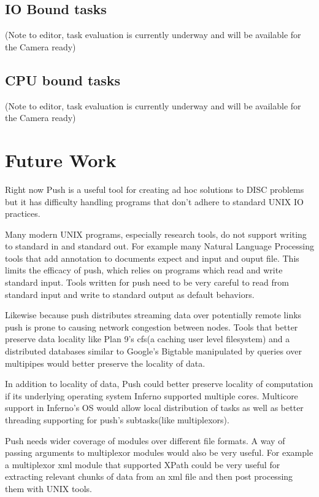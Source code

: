 \documentclass[11pt, letterpaper]{article}
\begin{document}
\subsection{IO Bound tasks}

(Note to editor, task evaluation is currently underway and will be available for the Camera ready)


\subsection{CPU bound tasks}

(Note to editor, task evaluation is currently underway and will be available for the Camera ready)     

\section{Future Work}
 
Right now Push is a useful tool for creating ad hoc solutions to DISC problems but it has difficulty handling programs that don't adhere to standard UNIX IO practices. 

Many modern UNIX programs, especially research tools, do not support writing to standard in and standard out. For example many Natural Language Processing tools that add annotation to documents expect and input and ouput file. This limits the efficacy of push, which relies on programs which read and write standard input. Tools written for push need to be very careful to read from standard input and write to standard output as default behaviors.

Likewise because push distributes streaming data over potentially remote links push is prone to causing network congestion between nodes. Tools that better preserve data locality like Plan 9's cfs(a caching user level filesystem) and a distributed databases similar to Google's Bigtable\cite{chang2006bds} manipulated by queries over multipipes would better preserve the locality of data. 

In addition to locality of data, Push could better preserve locality of computation  if its underlying operating system Inferno supported multiple cores.  Multicore support in Inferno's OS would allow local distribution of tasks as well as better threading supporting for push's subtasks(like multiplexors).

Push needs wider coverage of modules over different file formats. A way of passing arguments to multiplexor modules would also be very useful. For example a multiplexor xml module that supported XPath\cite{clark1999xpl} could be very useful for extracting relevant chunks of data from an xml file and then post processing them with UNIX tools.       
\end{document}
